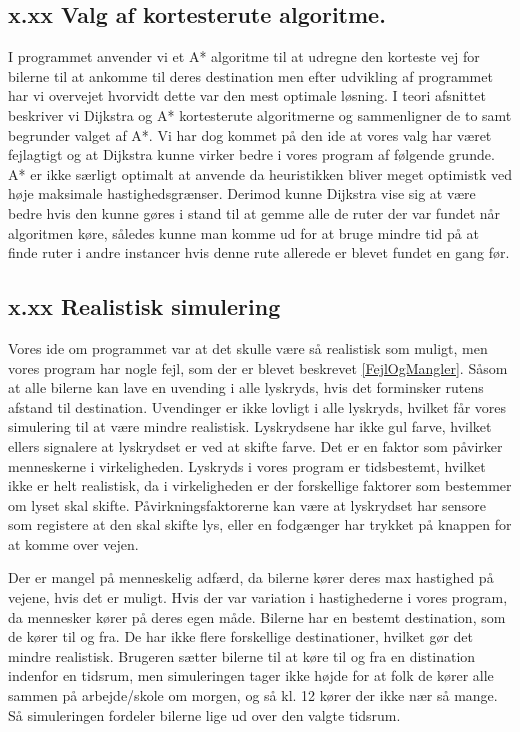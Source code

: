 \subsection{x.xx Valg af kortesterute algoritme.}
I programmet anvender vi et A* algoritme til at udregne den korteste vej for bilerne til at ankomme til deres destination men efter udvikling af programmet har vi overvejet hvorvidt dette var den mest optimale løsning. I teori afsnittet beskriver vi Dijkstra og A* kortesterute algoritmerne og sammenligner de to samt begrunder valget af A*. Vi har dog kommet på den ide at vores valg har været fejlagtigt og at Dijkstra kunne virker bedre i vores program af følgende grunde. A* er ikke særligt optimalt at anvende da heuristikken bliver meget optimistk ved høje maksimale hastighedsgrænser. Derimod kunne Dijkstra vise sig at være bedre hvis den kunne gøres i stand til at gemme alle de ruter der var fundet når algoritmen køre, således kunne man komme ud for at bruge mindre tid på at finde ruter i andre instancer hvis denne rute allerede er blevet fundet en gang før. 

\subsection{x.xx Realistisk simulering}
Vores ide om programmet var at det skulle være så realistisk som muligt, men vores program har nogle fejl, som der er blevet beskrevet \ref{FejlOgMangler}. Såsom at alle bilerne kan lave en uvending i alle lyskryds, hvis det forminsker rutens afstand til destination. Uvendinger er ikke lovligt i alle lyskryds, hvilket får vores simulering til at være mindre realistisk. Lyskrydsene har ikke gul farve, hvilket ellers signalere at lyskrydset er ved at skifte farve. Det er en faktor som påvirker menneskerne i virkeligheden. Lyskryds i vores program er tidsbestemt, hvilket ikke er helt realistisk, da i virkeligheden er der forskellige faktorer som bestemmer om lyset skal skifte. Påvirkningsfaktorerne kan være at lyskrydset har sensore som registere at den skal skifte lys, eller en fodgænger har trykket på knappen for at komme over vejen.

\vspace{5mm}

Der er mangel på menneskelig adfærd, da bilerne kører deres max hastighed på vejene, hvis det er muligt. Hvis der var variation i hastighederne i vores program, da mennesker kører på deres egen måde. Bilerne har en bestemt destination, som de kører til og fra. De har ikke flere forskellige destinationer, hvilket gør det mindre realistisk. Brugeren sætter bilerne til at køre til og fra en distination indenfor en tidsrum, men simuleringen tager ikke højde for at folk de kører alle sammen på arbejde/skole om morgen, og så kl. 12 kører der ikke nær så mange. Så simuleringen fordeler bilerne lige ud over den valgte tidsrum. 

